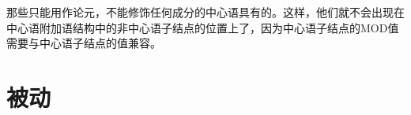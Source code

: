 那些只能用作论元，不能修饰任何成分的中心语具有的\modvc 。这样，他们就不会出现在中心语附加语结构中的非中心语子结点的位置上了，因为中心语子结点的MOD值需要与中心语子结点的\synsemc 值兼容。

\section{被动}
\label{Abschnitt-HPSG-Passiv}\label{sec-hpsg-passive}

